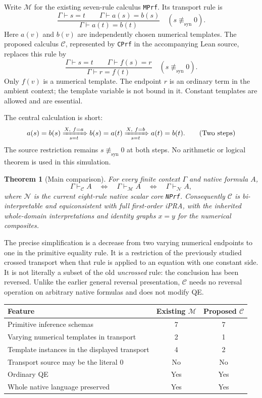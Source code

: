 \documentclass[11pt]{article}
\newtheorem{theorem}{Theorem}[section]
\theoremstyle{definition}\newtheorem{definition}[theorem]{Definition}
\theoremstyle{remark}\newtheorem{remark}[theorem]{Remark}
\newcommand{\C}{\mathcal C}
\newcommand{\N}{\mathcal N}
\newcommand{\M}{\mathcal M}
\newcommand{\nolit}{\not\equiv_{\mathrm{syn}}}
\begin{document}
Write $\M$ for the existing seven-rule calculus \texttt{MPrf}.
Its transport rule is
\[
 \frac{\Gamma\vdash s=t\qquad\Gamma\vdash a(s)=b(s)}
      {\Gamma\vdash a(t)=b(t)}
 \quad(s\nolit0).
 \tag{Old Tr}\label{eq:oldtr}
\]
Here $a(v)$ and $b(v)$ are independently chosen numerical templates.
The proposed calculus $\C$, represented by \texttt{CPrf} in the accompanying
Lean source, replaces this rule by
\[
 \boxed{\displaystyle
 \frac{\Gamma\vdash s=t\qquad\Gamma\vdash f(s)=r}
      {\Gamma\vdash r=f(t)}
 \quad(s\nolit0).}
 \tag{X}\label{eq:x}
\]
Only $f(v)$ is a numerical template. The endpoint $r$ is an ordinary
term in the ambient context; the template variable is not bound in it.
Constant templates are allowed and are essential.

The central calculation is short:
\[
 a(s)=b(s)
 \xRightarrow[\,s=t\,]{X,\ f=a} b(s)=a(t)
 \xRightarrow[\,s=t\,]{X,\ f=b} a(t)=b(t).
 \tag{Two steps}\label{eq:twosteps}
\]
The source restriction remains $s\nolit0$ at both steps.
No arithmetic or logical theorem is used in this simulation.

\begin{theorem}[Main comparison]\label{thm:main}
For every finite context $\Gamma$ and native formula $A$,
\[
   \Gamma\vdash_{\C}A
   \quad\Longleftrightarrow\quad
   \Gamma\vdash_{\M}A
   \quad\Longleftrightarrow\quad
   \Gamma\vdash_{\N}A,
\]
where $\N$ is the current eight-rule native scalar core \texttt{NPrf}.
Consequently $\C$ is bi-interpretable and equiconsistent with full
first-order iPRA, with the inherited whole-domain interpretations and
identity graphs $x=y$ for the numerical composites.
\end{theorem}

The precise simplification is a decrease from two varying numerical
endpoints to one in the primitive equality rule. It is a restriction of
the previously studied crossed transport when that rule is applied to an
equation with one constant side\cite{reversal}. It is not literally a
subset of the old \emph{uncrossed} rule: the conclusion has been reversed.
Unlike the earlier general reversal presentation, $\C$ needs no reversal
operation on arbitrary native formulas and does not modify QE.

\begin{center}
\begin{tabular}{@{}p{}cc@{}}
\toprule
Feature & Existing $\M$ & Proposed $\C$\\
\midrule
Primitive inference schemas & 7 & 7\\
Varying numerical templates in transport & 2 & 1\\
Template instances in the displayed transport & 4 & 2\\
Transport source may be the literal $0$ & No & No\\
Ordinary QE & Yes & Yes\\
Whole native language preserved & Yes & Yes\\
\bottomrule
\end{tabular}
\end{center}
\end{document}
